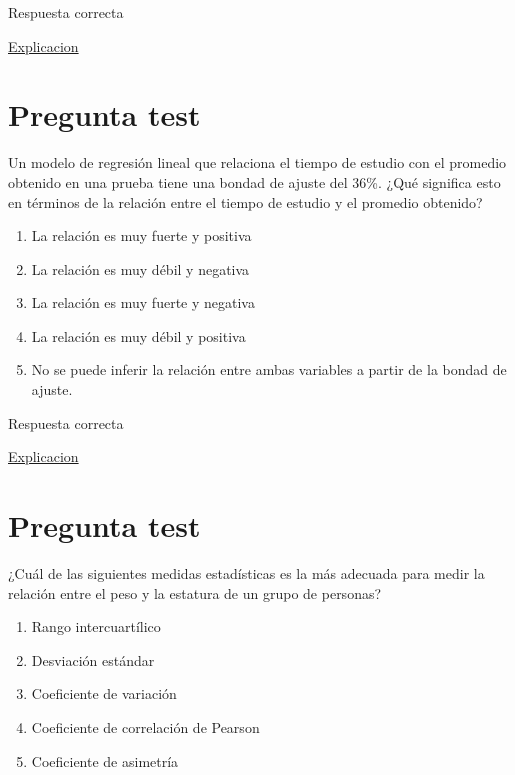 \documentclass[
]{book}
\providecommand{\tightlist}{%
  \setlength{\itemsep}{0pt}\setlength{\parskip}{0pt}}
\begin{document}
Respuesta correcta

\href{https://1fjmanzano.github.io/bioestadistica/relaci\%C3\%B3n-entre-variables-nume\%CC\%81ricas.html\#regresio\%CC\%81n-lineal}{Explicacion}

\hypertarget{pregunta-test-148}{%
\section{Pregunta test}\label{pregunta-test-148}}

Un modelo de regresión lineal que relaciona el tiempo de estudio con el promedio obtenido en una prueba tiene una bondad de ajuste del 36\%. ¿Qué significa esto en términos de la relación entre el tiempo de estudio y el promedio obtenido?

\begin{enumerate}
\def\labelenumi{\alph{enumi})}
\tightlist
\item
  La relación es muy fuerte y positiva
\item
  La relación es muy débil y negativa
\item
  La relación es muy fuerte y negativa
\item
  La relación es muy débil y positiva
\item
  No se puede inferir la relación entre ambas variables a partir de la bondad de ajuste.
\end{enumerate}

Respuesta correcta

\href{https://blog.minitab.com/es/analisis-de-regresion-como-puedo-interpretar-el-r-cuadrado-y-evaluar-la-bondad-de-ajuste}{Explicacion}

\hypertarget{pregunta-test-149}{%
\section{Pregunta test}\label{pregunta-test-149}}

¿Cuál de las siguientes medidas estadísticas es la más adecuada para medir la relación entre el peso y la estatura de un grupo de personas?

\begin{enumerate}
\def\labelenumi{\alph{enumi})}
\tightlist
\item
  Rango intercuartílico
\item
  Desviación estándar
\item
  Coeficiente de variación
\item
  Coeficiente de correlación de Pearson
\item
  Coeficiente de asimetría
\end{enumerate}
\end{document}
